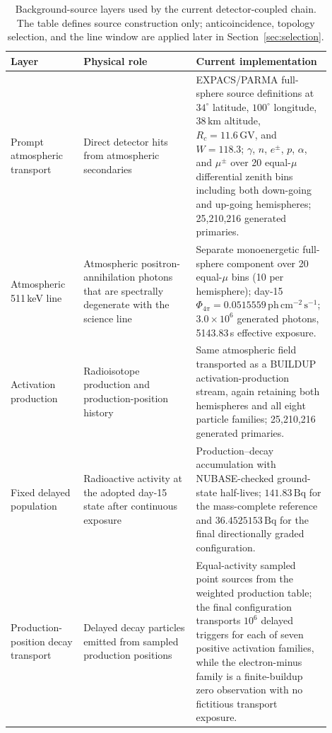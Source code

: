 \documentclass[11pt]{article}
\begin{document}
\begin{table}[t]
\centering
\caption{Background-source layers used by the current detector-coupled chain. The table defines source construction only; anticoincidence, topology selection, and the line window are applied later in Section~\ref{sec:selection}.}
\label{tab:background_source_model}
\begin{tabular}{p{0.22\linewidth}p{0.34\linewidth}p{0.34\linewidth}}
\hline
Layer & Physical role & Current implementation \\
\hline
Prompt atmospheric transport & Direct detector hits from atmospheric secondaries & EXPACS/PARMA full-sphere source definitions at $34^\circ$ latitude, $100^\circ$ longitude, $38\,\mathrm{km}$ altitude, $R_c=11.6\,\mathrm{GV}$, and $W=118.3$; $\gamma$, $n$, $e^\pm$, $p$, $\alpha$, and $\mu^\pm$ over 20 equal-$\mu$ differential zenith bins including both down-going and up-going hemispheres; 25,210,216 generated primaries. \\
Atmospheric 511\,keV line & Atmospheric positron-annihilation photons that are spectrally degenerate with the science line & Separate monoenergetic full-sphere component over 20 equal-$\mu$ bins (10 per hemisphere); day-15 $\Phi_{4\pi}=0.0515559\,\mathrm{ph\,cm^{-2}\,s^{-1}}$; $3.0\times10^6$ generated photons, 5143.83\,s effective exposure. \\
Activation production & Radioisotope production and production-position history & Same atmospheric field transported as a BUILDUP activation-production stream, again retaining both hemispheres and all eight particle families; 25,210,216 generated primaries. \\
Fixed delayed population & Radioactive activity at the adopted day-15 state after continuous exposure & Production--decay accumulation with NUBASE-checked ground-state half-lives; $141.83\,\mathrm{Bq}$ for the mass-complete reference and $36.4525153\,\mathrm{Bq}$ for the final directionally graded configuration. \\
Production-position decay transport & Delayed decay particles emitted from sampled production positions & Equal-activity sampled point sources from the weighted production table; the final configuration transports $10^6$ delayed triggers for each of seven positive activation families, while the electron-minus family is a finite-buildup zero observation with no fictitious transport exposure. \\
\hline
\end{tabular}
\end{table}
\end{document}
